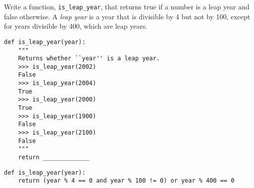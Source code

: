 \begin{blocksection}
\question Write a function, \lstinline$is_leap_year$, that returns true if a number is a leap year and false otherwise.
A \emph{leap year} is a year that is divisible by 4 but not by 100, except for years divisible by 400, which are leap years. 

\begin{lstlisting}
def is_leap_year(year):
    """
    Returns whether ``year'' is a leap year. 
    >>> is_leap_year(2002)
    False
    >>> is_leap_year(2004)
    True
    >>> is_leap_year(2000)
    True
    >>> is_leap_year(1900)
    False
    >>> is_leap_year(2100)
    False
    """
    return _____________
\end{lstlisting}


\begin{solution}[2in]
\begin{lstlisting}
def is_leap_year(year):
    return (year % 4 == 0 and year % 100 != 0) or year % 400 == 0
\end{lstlisting}
\end{solution}
\end{blocksection}
